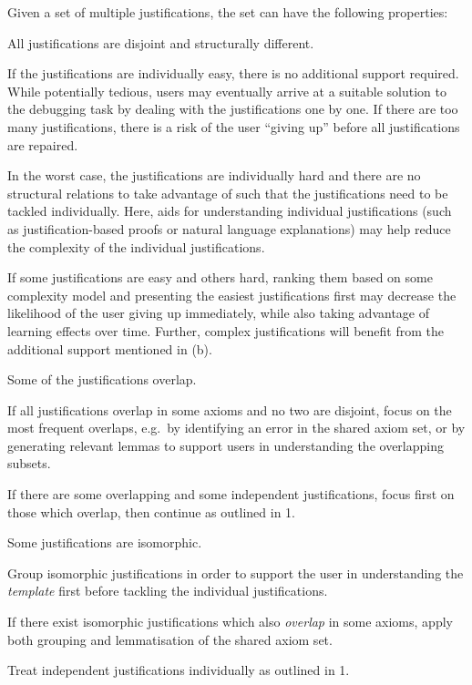 Given a set of multiple justifications, the set can have the following properties:
\begin{compactenum}
\item All justifications are disjoint and structurally different.
\begin{compactenum}
\item If the justifications are individually easy, there is no additional support required. While potentially tedious, users may eventually arrive at a suitable solution to the debugging task by dealing with the justifications one by one. If there are too many justifications, there is a risk of the user \enquote{giving up} before all justifications are repaired.
\item In the worst case, the justifications are individually hard and there are no structural relations to take advantage of such that the justifications need to be tackled individually. Here, aids for understanding individual justifications (such as justification-based proofs or natural language explanations) may help reduce the complexity of the individual justifications.
\item If some justifications are easy and others hard, ranking them based on some complexity model and presenting the easiest justifications first may decrease the likelihood of the user giving up immediately, while also taking advantage of learning effects over time. Further, complex justifications will benefit from the additional support mentioned in (b).
\end{compactenum}
\item Some of the justifications overlap. 
\begin{compactenum}
\item If all justifications overlap in some axioms and no two are disjoint, focus on the most frequent overlaps, e.g.\ by identifying an error in the shared axiom set, or by generating relevant lemmas to support users in understanding the overlapping subsets.
\item If there are some overlapping and some independent justifications, focus first on those which overlap, then continue as outlined in 1.
\end{compactenum}
\item Some justifications are isomorphic.
\begin{compactenum}
\item Group isomorphic justifications in order to support the user in understanding the \emph{template} first before tackling the individual justifications.
\item If there exist isomorphic justifications which also \emph{overlap} in some axioms, apply both grouping and lemmatisation of the shared axiom set.
\item Treat independent justifications individually as outlined in 1.
\end{compactenum}
\end{compactenum}

